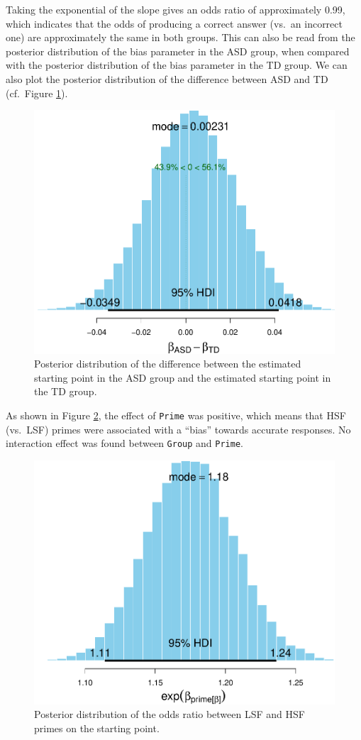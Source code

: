 \documentclass[
  11pt,
  english,
  ,doc,floatsintext]{apa6}
\begin{document}
Taking the exponential of the slope gives an odds ratio of approximately 0.99, which indicates that the odds of producing a correct answer (vs.~an incorrect one) are approximately the same in both groups. This can also be read from the posterior distribution of the bias parameter in the ASD group, when compared with the posterior distribution of the bias parameter in the TD group. We can also plot the posterior distribution of the difference between ASD and TD (cf.~Figure \ref{fig:posterior-bias-difference}).

\begin{figure}[!htb]

{\centering \includegraphics[width=0.5\linewidth]{supplementary_materials_files/figure-latex/posterior-bias-difference-1} 

}

\caption{Posterior distribution of the difference between the estimated starting point in the ASD group and the estimated starting point in the TD group.}\label{fig:posterior-bias-difference}
\end{figure}

As shown in Figure \ref{fig:posterior-bias-prime}, the effect of \texttt{Prime} was positive, which means that HSF (vs.~LSF) primes were associated with a \enquote{bias} towards accurate responses. No interaction effect was found between \texttt{Group} and \texttt{Prime}.

\begin{figure}[!htb]

{\centering \includegraphics[width=0.5\linewidth]{supplementary_materials_files/figure-latex/posterior-bias-prime-1} 

}

\caption{Posterior distribution of the odds ratio between LSF and HSF primes on the starting point.}\label{fig:posterior-bias-prime}
\end{figure}
\end{document}
